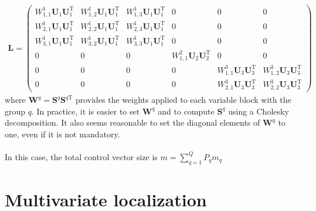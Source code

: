 \documentclass[12pt]{scrartcl}
\begin{document}
\begin{align}
\mathbf{L} = \left( \begin{array}{ccc|c|cc}
W^1_{1,1} \mathbf{U}_1 \mathbf{U}_1^\mathrm{T} & W^1_{1,2} \mathbf{U}_1 \mathbf{U}_1^\mathrm{T} & W^1_{1,3} \mathbf{U}_1 \mathbf{U}_1^\mathrm{T} & 0 & 0 & 0 \\
W^1_{2,1} \mathbf{U}_1 \mathbf{U}_1^\mathrm{T} & W^1_{2,2} \mathbf{U}_1 \mathbf{U}_1^\mathrm{T} & W^1_{2,3} \mathbf{U}_1 \mathbf{U}_1^\mathrm{T} & 0 & 0 & 0 \\
W^1_{3,1} \mathbf{U}_1 \mathbf{U}_1^\mathrm{T} & W^1_{3,2} \mathbf{U}_1 \mathbf{U}_1^\mathrm{T} & W^1_{3,3} \mathbf{U}_1 \mathbf{U}_1^\mathrm{T} & 0 & 0 & 0 \\[0.3ex]
\hline
0 & 0 & 0 & W^2_{1,1} \mathbf{U}_2 \mathbf{U}_2^\mathrm{T} & 0 & 0 \\[0.3ex]
\hline
0 & 0 & 0 & 0 & W^3_{1,1} \mathbf{U}_3 \mathbf{U}_3^\mathrm{T} & W^3_{1,2} \mathbf{U}_3 \mathbf{U}_3^\mathrm{T} \\
0 & 0 & 0 & 0 & W^3_{2,1} \mathbf{U}_3 \mathbf{U}_3^\mathrm{T} & W^3_{2,2} \mathbf{U}_3 \mathbf{U}_3^\mathrm{T}
\end{array} \right)
\end{align}
where $\mathbf{W}^q = \mathbf{S}^q \mathbf{S}^{q\mathrm{T}}$ provides the weights applied to each variable block with the group $q$. In practice, it is easier to set $\mathbf{W}^q$ and to compute $\mathbf{S}^q$ using a Cholesky decomposition. It also seems reasonable to set the diagonal elements of $\mathbf{W}^q$ to one, even if it is not mandatory.\\
$  $\\
In this case, the total control vector size is $\displaystyle m = \sum_{q=1}^Q P_q m_q$

\section{Multivariate localization}
\end{document}
